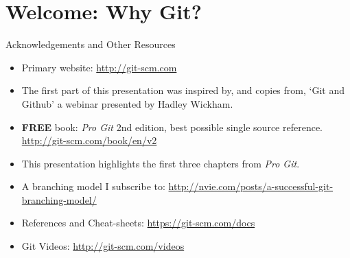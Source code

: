   \section{Welcome: Why Git?}
  \begin{frame}[t]{Acknowledgements and Other Resources}

    \begin{itemize}

      \item Primary website: \url{http://git-scm.com}

      \item The first part of this presentation was inspired by, and copies
        from, `Git and Github' a webinar presented by Hadley Wickham.

      \item {\bf FREE} book: {\it Pro Git} 2nd
        edition, best possible single source
        reference. \url{http://git-scm.com/book/en/v2}

      \item This presentation highlights the first three chapters from
        {\it Pro Git}.

      \item A branching model I subscribe to:
        \url{http://nvie.com/posts/a-successful-git-branching-model/}

      \item References and Cheat-sheets:
        \url{https://git-scm.com/docs}

      \item Git Videos: \url{http://git-scm.com/videos}

    \end{itemize} 
  \end{frame}

